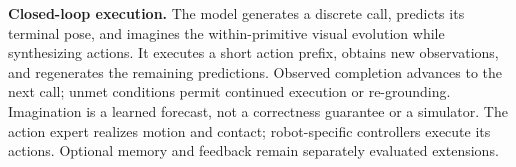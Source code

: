 \textbf{Closed-loop execution.} The model generates a discrete call, predicts its terminal pose, and imagines the within-primitive visual evolution while synthesizing actions. It executes a short action prefix, obtains new observations, and regenerates the remaining predictions. Observed completion advances to the next call; unmet conditions permit continued execution or re-grounding. Imagination is a learned forecast, not a correctness guarantee or a simulator. The action expert realizes motion and contact; robot-specific controllers execute its actions. Optional memory and feedback remain separately evaluated extensions.
